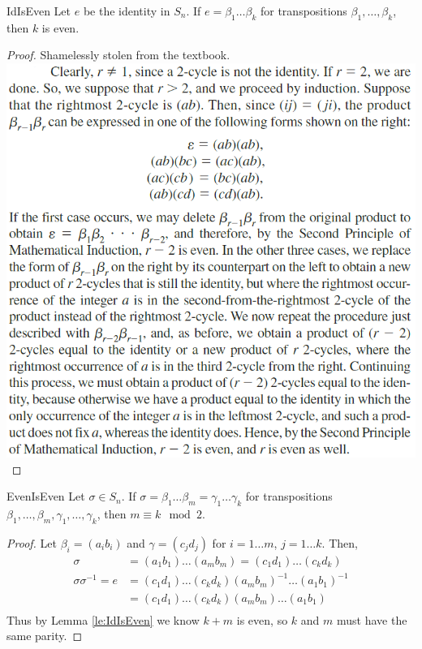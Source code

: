 \documentclass[12pt]{article}
\newcommand{\inv}{^{-1}}
\begin{document}
	\begin{mylem}{}{IdIsEven}
		Let $e$ be the identity in $S_n$. If $e=\beta_1\dots\beta_k$ for transpositions $\beta_1, \dots, \beta_k$, then $k$ is even.
		\begin{proof}
			Shamelessly stolen from the textbook.\\\includegraphics[scale=.7]{textproof1.png}
		\end{proof}
	\end{mylem}
	
	\begin{mythm}{}{EvenIsEven}
		Let $\sigma\in S_n$. If $\sigma=\beta_1\dots\beta_m=\gamma_1\dots\gamma_k$ for transpositions $\beta_1, \dots, \beta_m, \gamma_1, \dots, \gamma_k$, then $m\equiv k\mod2$.
		\begin{proof}
			Let $\beta_i=(a_ib_i)$ and $\gamma=(c_jd_j)$ for $i=1\dots m$, $j=1\dots k$. Then,
			\begin{align*}
				\sigma&=(a_1b_1)\dots(a_mb_m)=(c_1d_1)\dots(c_kd_k)\\
				\sigma\sigma\inv=e&=(c_1d_1)\dots(c_kd_k)(a_mb_m)\inv\dots(a_1b_1)\inv\\
				&=(c_1d_1)\dots(c_kd_k)(a_mb_m)\dots(a_1b_1)\\
			\end{align*}
			Thus by Lemma \ref{le:IdIsEven} we know $k+m$ is even, so $k$ and $m$ must have the same parity.
		\end{proof}
	\end{mythm}
	
\end{document}
